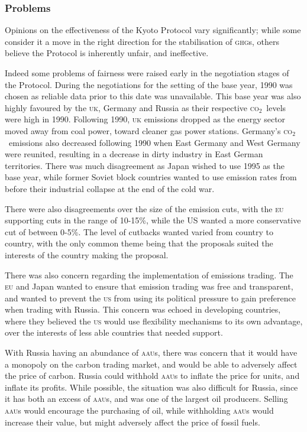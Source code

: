 \documentclass[]{article} %
\newcommand{\CO}{\textsc{co}$_2$~}
\begin{document}
\subsubsection{Problems}

Opinions on the effectiveness of the Kyoto Protocol vary significantly; while some consider it a move in the right direction for the stabilisation of \textsc{ghg}s, others believe the Protocol is inherently unfair, and ineffective.

Indeed some problems of fairness were raised early in the negotiation stages of the Protocol. During the negotiations for the setting of the base year, 1990 was chosen as reliable data prior to this date was unavailable. This base year was also highly favoured by the \textsc{uk}, Germany and Russia as their respective \CO levels were high in 1990. Following 1990, \textsc{uk} emissions dropped as the energy sector moved away from coal power, toward cleaner gas power stations. Germany’s \CO emissions also decreased following 1990 when East Germany and West Germany were reunited, resulting in a decrease in dirty industry in East German territories. There was much disagreement as Japan wished to use 1995 as the base year, while former Soviet block countries wanted to use emission rates from before their industrial collapse at the end of the cold war.

There were also disagreements over the size of the emission cuts, with the \textsc{eu} supporting cuts in the range of 10-15\%, while the US wanted a more conservative cut of between 0-5\%. The level of cutbacks wanted varied from country to country, with the only common theme being that the proposals suited the interests of the country making the proposal.~\cite{Grubb-economics}

There was also concern regarding the implementation of emissions trading. The \textsc{eu} and Japan wanted to ensure that emission trading was free and transparent, and wanted to prevent the \textsc{us} from using its political pressure to gain preference when trading with Russia. This concern was echoed in developing countries, where they believed the \textsc{us} would use flexibility mechanisms to its own advantage, over the interests of less able countries that needed support.

With Russia having an abundance of \textsc{aau}s, there was concern that it would have a monopoly on the carbon trading market, and would be able to adversely affect the price of carbon. Russia could withhold \textsc{aau}s to inflate the price for units, and inflate its profits. While possible, the situation was also difficult for Russia, since it has both an excess of \textsc{aau}s, and was one of the largest oil producers. Selling \textsc{aau}s would encourage the purchasing of oil, while withholding \textsc{aau}s would increase their value, but might adversely affect the price of fossil fuels.
\end{document}
